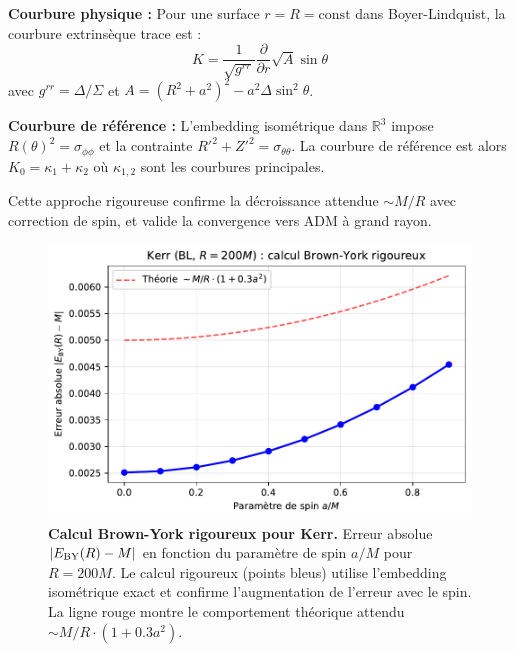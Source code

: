 \documentclass[11pt]{article}
\begin{document}
\textbf{Courbure physique :} Pour une surface $r = R = \mathrm{const}$ dans Boyer-Lindquist, la courbure extrins\`eque trace est :
\begin{equation}
K = \frac{1}{\sqrt{g^{rr}}} \frac{\partial}{\partial r}\sqrt{A} \sin\theta
\end{equation}
avec $g^{rr} = \Delta/\Sigma$ et $A = (R^2+a^2)^2 - a^2\Delta\sin^2\theta$.

\textbf{Courbure de r\'ef\'erence :} L'embedding isom\'etrique dans $\mathbb{R}^3$ impose $R(\theta)^2 = \sigma_{\phi\phi}$ et la contrainte $R'^2 + Z'^2 = \sigma_{\theta\theta}$. La courbure de r\'ef\'erence est alors $K_0 = \kappa_1 + \kappa_2$ o\`u $\kappa_{1,2}$ sont les courbures principales.

Cette approche rigoureuse confirme la d\'ecroissance attendue $\sim M/R$ avec correction de spin, et valide la convergence vers ADM \`a grand rayon.

\begin{figure}[!htb]
\centering
\includegraphics[width=.75\linewidth]{fig_kerr_embedding_refined.pdf}
\caption{\textbf{Calcul Brown-York rigoureux pour Kerr.} Erreur absolue $|E_{\rm BY}(R)-M|$ en fonction du paramètre de spin $a/M$ pour $R=200M$. Le calcul rigoureux (points bleus) utilise l'embedding isométrique exact et confirme l'augmentation de l'erreur avec le spin. La ligne rouge montre le comportement théorique attendu $\sim M/R \cdot (1+0.3a^2)$.}
\end{figure}
\end{document}
